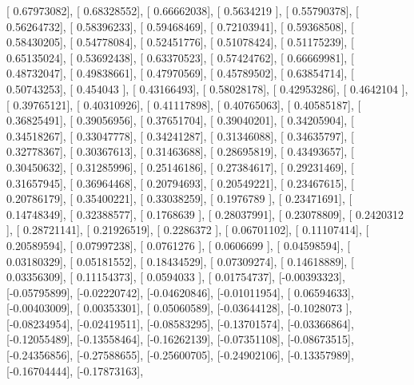 \documentclass{article}
\begin{document}
       [ 0.67973082],
       [ 0.68328552],
       [ 0.66662038],
       [ 0.5634219 ],
       [ 0.55790378],
       [ 0.56264732],
       [ 0.58396233],
       [ 0.59468469],
       [ 0.72103941],
       [ 0.59368508],
       [ 0.58430205],
       [ 0.54778084],
       [ 0.52451776],
       [ 0.51078424],
       [ 0.51175239],
       [ 0.65135024],
       [ 0.53692438],
       [ 0.63370523],
       [ 0.57424762],
       [ 0.66669981],
       [ 0.48732047],
       [ 0.49838661],
       [ 0.47970569],
       [ 0.45789502],
       [ 0.63854714],
       [ 0.50743253],
       [ 0.454043  ],
       [ 0.43166493],
       [ 0.58028178],
       [ 0.42953286],
       [ 0.4642104 ],
       [ 0.39765121],
       [ 0.40310926],
       [ 0.41117898],
       [ 0.40765063],
       [ 0.40585187],
       [ 0.36825491],
       [ 0.39056956],
       [ 0.37651704],
       [ 0.39040201],
       [ 0.34205904],
       [ 0.34518267],
       [ 0.33047778],
       [ 0.34241287],
       [ 0.31346088],
       [ 0.34635797],
       [ 0.32778367],
       [ 0.30367613],
       [ 0.31463688],
       [ 0.28695819],
       [ 0.43493657],
       [ 0.30450632],
       [ 0.31285996],
       [ 0.25146186],
       [ 0.27384617],
       [ 0.29231469],
       [ 0.31657945],
       [ 0.36964468],
       [ 0.20794693],
       [ 0.20549221],
       [ 0.23467615],
       [ 0.20786179],
       [ 0.35400221],
       [ 0.33038259],
       [ 0.1976789 ],
       [ 0.23471691],
       [ 0.14748349],
       [ 0.32388577],
       [ 0.1768639 ],
       [ 0.28037991],
       [ 0.23078809],
       [ 0.2420312 ],
       [ 0.28721141],
       [ 0.21926519],
       [ 0.2286372 ],
       [ 0.06701102],
       [ 0.11107414],
       [ 0.20589594],
       [ 0.07997238],
       [ 0.0761276 ],
       [ 0.0606699 ],
       [ 0.04598594],
       [ 0.03180329],
       [ 0.05181552],
       [ 0.18434529],
       [ 0.07309274],
       [ 0.14618889],
       [ 0.03356309],
       [ 0.11154373],
       [ 0.0594033 ],
       [ 0.01754737],
       [-0.00393323],
       [-0.05795899],
       [-0.02220742],
       [-0.04620846],
       [-0.01011954],
       [ 0.06594633],
       [-0.00403009],
       [ 0.00353301],
       [ 0.05060589],
       [-0.03644128],
       [-0.1028073 ],
       [-0.08234954],
       [-0.02419511],
       [-0.08583295],
       [-0.13701574],
       [-0.03366864],
       [-0.12055489],
       [-0.13558464],
       [-0.16262139],
       [-0.07351108],
       [-0.08673515],
       [-0.24356856],
       [-0.27588655],
       [-0.25600705],
       [-0.24902106],
       [-0.13357989],
       [-0.16704444],
       [-0.17873163],
\end{document}
